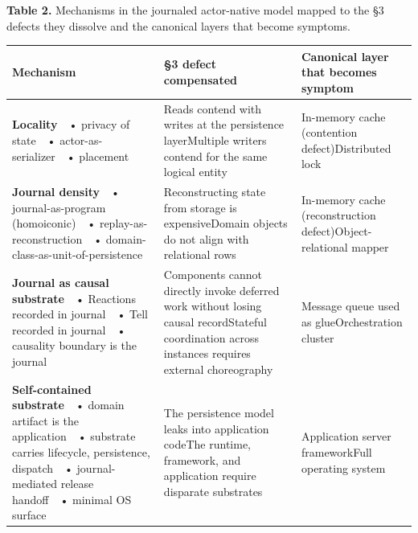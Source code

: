 \documentclass[
]{article}
\newcounter{none} %
\begin{document}
\textbf{Table 2.} Mechanisms in the journaled actor-native model mapped
to the §3 defects they dissolve and the canonical layers that become
symptoms.

{\def\LTcaptype{none} %
\begin{longtable}[]{@{}
  >{\raggedright\arraybackslash}p{}
  >{\raggedright\arraybackslash}p{}
  >{\raggedright\arraybackslash}p{}@{}}
\toprule\noalign{}
\begin{minipage}[b]{\linewidth}\raggedright
Mechanism
\end{minipage} & \begin{minipage}[b]{\linewidth}\raggedright
§3 defect compensated
\end{minipage} & \begin{minipage}[b]{\linewidth}\raggedright
Canonical layer that becomes symptom
\end{minipage} \\
\midrule\noalign{}
\endhead
\bottomrule\noalign{}
\endlastfoot
\textbf{Locality}~~• privacy of state~~• actor-as-serializer~~•
placement & Reads contend with writes at the persistence layerMultiple
writers contend for the same logical entity & In-memory cache
(contention defect)Distributed lock \\
\textbf{Journal density}~~• journal-as-program (homoiconic)~~•
replay-as-reconstruction~~• domain-class-as-unit-of-persistence &
Reconstructing state from storage is expensiveDomain objects do not
align with relational rows & In-memory cache (reconstruction
defect)Object-relational mapper \\
\textbf{Journal as causal substrate}~~• Reactions recorded in journal~~•
Tell recorded in journal~~• causality boundary is the journal &
Components cannot directly invoke deferred work without losing causal
recordStateful coordination across instances requires external
choreography & Message queue used as glueOrchestration cluster \\
\textbf{Self-contained substrate}~~• domain artifact is the
application~~• substrate carries lifecycle, persistence, dispatch~~•
journal-mediated release handoff~~• minimal OS surface & The persistence
model leaks into application codeThe runtime, framework, and application
require disparate substrates & Application server frameworkFull
operating system \\
\end{longtable}
}
\end{document}
